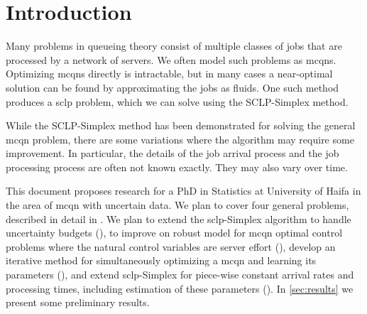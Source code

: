 \documentclass[11pt,a4paper,titlepage]{article}
\theoremstyle{definition}
\theoremstyle{plain}
\begin{document}
    \section{Introduction}
    \label{sec:introduction}


    Many problems in queueing theory consist of multiple classes of jobs
    that are processed by a network of servers.
    We often model such problems as \Glspl{mcqn}.
    Optimizing \glspl{mcqn} directly is intractable,
    but in many cases a near-optimal solution can be found by approximating the jobs as fluids.
    One such method produces a \gls{sclp} problem,
    which we can solve using the SCLP-Simplex method.


    While the SCLP-Simplex method has been demonstrated for solving the general \gls{mcqn} problem,
    there are some variations where the algorithm may require some improvement.
    In particular,
    the details of the job arrival process and the job processing process are often not known exactly.
    They may also vary over time.

    This document proposes research for a PhD in Statistics at University of Haifa in the area of \gls{mcqn} with uncertain data.
    We plan to cover four general problems,
    described in detail in .
    We plan to extend the \gls{sclp}-Simplex algorithm to handle uncertainty budgets (),
    to improve on \autocite{bertsimas2014robust} robust model for \gls{mcqn} optimal control problems where the natural control variables are server effort (),
    develop an iterative method for simultaneously optimizing a \gls{mcqn} and learning its parameters (),
    and extend \gls{sclp}-Simplex for piece-wise constant arrival rates and processing times,
    including estimation of these parameters ().
    In \cref{sec:results} we present some preliminary results.
\end{document}
